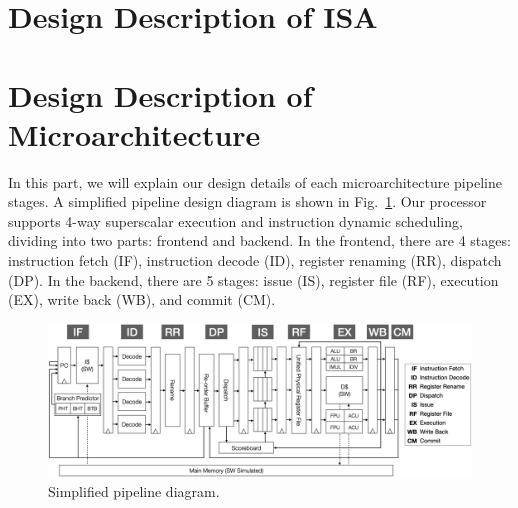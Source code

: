 \section{Design Description of ISA} %

\section{Design Description of Microarchitecture}
In this part, we will explain our design details of each microarchitecture pipeline stages. A simplified pipeline design diagram is shown in Fig.~\ref{fig:pipeline}. Our processor supports 4-way superscalar execution and instruction dynamic scheduling, dividing into two parts: frontend and backend. In the frontend, there are 4 stages: instruction fetch (IF), instruction decode (ID), register renaming (RR), dispatch (DP). In the backend, there are 5 stages: issue (IS), register file (RF), execution (EX), write back (WB), and commit (CM).

\begin{figure}
    \centering
    \includegraphics[width=\textwidth]{figure/design.png}
    \caption{Simplified pipeline diagram.}
    \label{fig:pipeline}
\end{figure}

